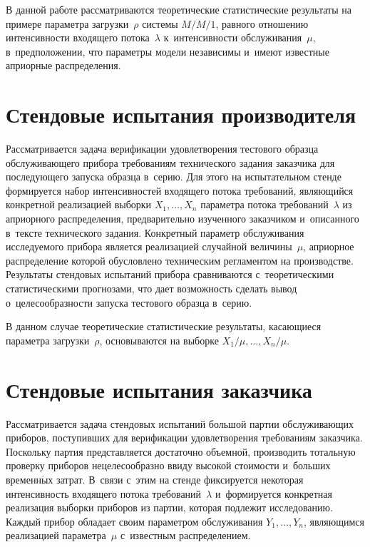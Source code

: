 \begin{multicols}{2}
В данной работе рассматриваются теоретические статистические результаты 
на примере парамет\-ра загрузки~$\rho$ системы $M/M/1$, равного отношению 
интенсивности входящего потока~$\lambda$ к~интенсивности обслуживания~$\mu$, 
в~предположении, что параметры модели независимы и~имеют известные априорные 
распределения.

\section{Стендовые испытания производителя}

Рассматривается задача верификации удовлетворения тестового образца обслуживающего 
прибора требованиям технического задания заказчика для последующего запуска 
образца в~серию. Для этого на испытательном стенде формируется набор 
интенсивностей входящего потока требований, являющийся конкретной 
реализацией выборки $X_1,\ldots,X_n$ параметра потока требований~$\lambda$ из
априорного распределения, предварительно изучен\-но\-го заказчиком и~описанного в~тексте 
технического задания. Конкретный параметр обслуживания исследуемого прибора является 
реализацией случайной величины~$\mu$, априорное распределение которой обусловлено 
техническим регламен\-том на производстве. Результаты стендовых испытаний прибора 
сравниваются с~теоретическими статистическими прогнозами, что дает возможность 
сделать вывод о~целесообразности запуска тестового образца в~серию.

В данном случае теоретические статистические результаты, касающиеся параметра 
загрузки~$\rho$, основываются на выборке $X_1/\mu,\ldots,X_n/\mu$.

\section{Стендовые испытания заказчика}

Рассматривается задача стендовых испытаний большой партии обслуживающих приборов, 
поступивших для верификации удовлетворения требованиям заказчика. Поскольку партия 
представляется достаточно объемной, производить тотальную проверку приборов 
нецелесообразно ввиду высокой стоимости и~больших временн$\acute{\mbox{ы}}$х затрат. В~связи 
с~этим на стенде фиксируется некоторая интенсивность входящего потока 
требований~$\lambda$ и~формируется конкретная реализация выборки приборов из партии, 
которая подлежит исследованию. Каждый прибор обладает своим параметром 
обслуживания $Y_1,\ldots,Y_n$, являющимся реализацией параметра~$\mu$ 
с~известным распределением. 


\end{multicols}
